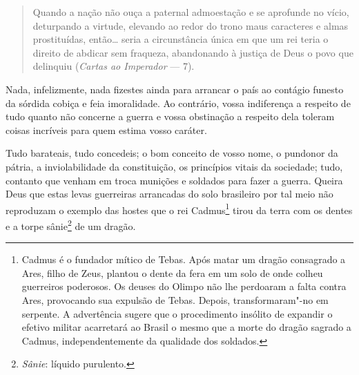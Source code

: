 \begin{linenumbers}
\begin{quote}
Quando a nação não ouça a paternal admoestação e se aprofunde no vício,
deturpando a virtude, elevando ao redor do trono maus caracteres e
almas prostituídas, então\ldots{} seria a circunstância única em que um rei
teria o direito de abdicar sem fraqueza, abandonando à justiça de Deus
o povo que delinquiu (\textit{Cartas ao Imperador} --- 7\ai). 
\end{quote}

Nada, infelizmente, nada fizestes ainda para arrancar o país ao contágio
funesto da sórdida cobiça e feia imoralidade. Ao contrário, vossa
indiferença a respeito de tudo quanto não concerne a guerra e vossa
obstinação a respeito dela toleram coisas incríveis para quem estima vosso caráter.

Tudo barateais, tudo concedeis; o bom conceito de vosso nome, o pundonor
da pátria, a inviolabilidade da constituição, os princípios vitais da
sociedade; tudo, contanto que venham em troca munições e soldados para
fazer a guerra. Queira Deus que estas levas guerreiras arrancadas do
solo brasileiro por tal meio não reproduzam o exemplo das hostes que o
rei Cadmus\footnote{ Cadmus é o fundador mítico de Tebas. Após matar um dragão consagrado a
Ares, filho de Zeus, plantou o dente da fera em um solo de onde colheu
guerreiros poderosos. Os deuses do Olimpo não lhe perdoaram a falta
contra Ares, provocando sua expulsão de Tebas. Depois, 
transformaram"-no em serpente. A advertência sugere que o procedimento
insólito de expandir o efetivo militar acarretará ao Brasil o mesmo que
a morte do dragão sagrado a Cadmus, independentemente da qualidade dos
soldados.} tirou da terra com os dentes e a torpe
sânie\footnote{ \textit{Sânie}: líquido purulento.} de um dragão.

\end{linenumbers}

\sectionitem

